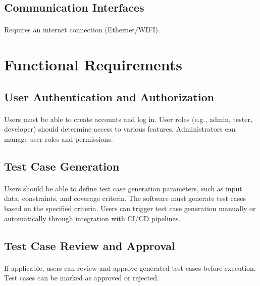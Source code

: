 \documentclass{article}
\begin{document}
\subsection{Communication Interfaces}
\paragraph{}
Requires an internet connection (Ethernet/WIFI).


\section{Functional Requirements}
\subsection{User Authentication and Authorization}
\paragraph{}
Users must be able to create accounts and log in.
User roles (e.g., admin, tester, developer) should determine access to various features.
Administrators can manage user roles and permissions.

\subsection{Test Case Generation}
\paragraph{}
Users should be able to define test case generation parameters, such as input data,
constraints, and coverage criteria. The software must generate test cases based on the
specified criteria. Users can trigger test case generation manually or automatically
through integration with CI/CD pipelines.

\subsection{Test Case Review and Approval}
\paragraph{}
If applicable, users can review and approve generated test cases before execution.\\
Test cases can be marked as approved or rejected.
\end{document}
